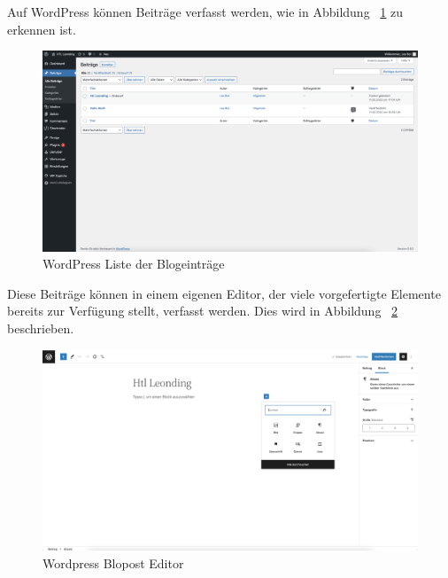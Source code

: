 Auf WordPress können Beiträge verfasst werden, wie in Abbildung ~\ref{fig:impl:bloglist} zu erkennen ist.

\begin{figure}[hbt!]
    \centering
    \includegraphics[scale=0.2]{pics/bloglist}
    \caption{WordPress Liste der Blogeinträge}
    \label{fig:impl:bloglist}
\end{figure}


Diese Beiträge können in einem eigenen Editor, der viele vorgefertigte Elemente bereits zur Verfügung stellt, verfasst werden.
Dies wird in Abbildung ~\ref{fig:impl:blogpost} beschrieben.

\begin{figure}[hbt!]
    \centering
    \includegraphics[scale=0.2]{pics/blogpost}
    \caption{Wordpress Blopost Editor}
    \label{fig:impl:blogpost}
\end{figure}
